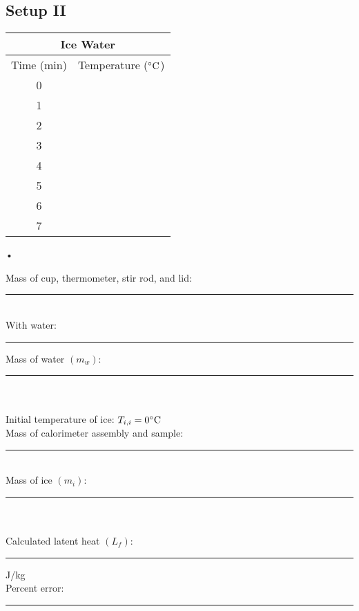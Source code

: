\documentclass[main.tex]{subfiles}
\begin{document}
\begin{onehalfspace}
\subsection*{Setup II}
\begin{wraptable}{r}{0.25\textwidth}
\begin{tabular}{|c|c|}
\hline
\multicolumn{2}{|c|}{Ice Water}\\
\hline
Time (min) & Temperature ($\celsius$)\\
\hline
0 & \\
\hline
1 & \\
\hline
2 & \\
\hline
3 & \\
\hline
4 & \\
\hline
5 & \\
\hline
6 & \\
\hline
7 & \\
\hline
\end{tabular}•
\end{wraptable}
Mass of cup, thermometer, stir rod, and lid:\rule[-1mm]{2cm}{.1pt}\\
With water:\rule[-1mm]{2cm}{.1pt} Mass of water $(m_w)$:\rule[-1mm]{1.7cm}{.1pt}\\ \\
Initial temperature of ice: $T_{i,i}=0\celsius$\\
Mass of calorimeter assembly and sample:\rule[-1mm]{2cm}{.1pt}\\
Mass of ice $(m_i)$:\rule[-1mm]{2cm}{.1pt}\\ \\
Calculated latent heat $(L_f)$:\rule[-1mm]{2cm}{.1pt} J/kg\\
Percent error:\rule[-1mm]{2cm}{.1pt}
\end{onehalfspace}
\end{document}
